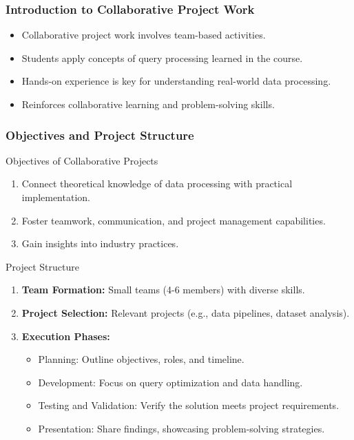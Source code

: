 \documentclass[aspectratio=169]{beamer}
\begin{document}
\begin{frame}[fragile]
    \frametitle{Introduction to Collaborative Project Work}

    \begin{itemize}
        \item Collaborative project work involves team-based activities.
        \item Students apply concepts of query processing learned in the course.
        \item Hands-on experience is key for understanding real-world data processing.
        \item Reinforces collaborative learning and problem-solving skills.
    \end{itemize}
\end{frame}

\begin{frame}[fragile]
    \frametitle{Objectives and Project Structure}

    \begin{block}{Objectives of Collaborative Projects}
        \begin{enumerate}
            \item Connect theoretical knowledge of data processing with practical implementation.
            \item Foster teamwork, communication, and project management capabilities.
            \item Gain insights into industry practices.
        \end{enumerate}
    \end{block}

    \begin{block}{Project Structure}
        \begin{enumerate}
            \item \textbf{Team Formation:} Small teams (4-6 members) with diverse skills.
            \item \textbf{Project Selection:} Relevant projects (e.g., data pipelines, dataset analysis).
            \item \textbf{Execution Phases:}
                \begin{itemize}
                    \item Planning: Outline objectives, roles, and timeline.
                    \item Development: Focus on query optimization and data handling.
                    \item Testing and Validation: Verify the solution meets project requirements.
                    \item Presentation: Share findings, showcasing problem-solving strategies.
                \end{itemize}
        \end{enumerate}
    \end{block}
\end{frame}
\end{document}
